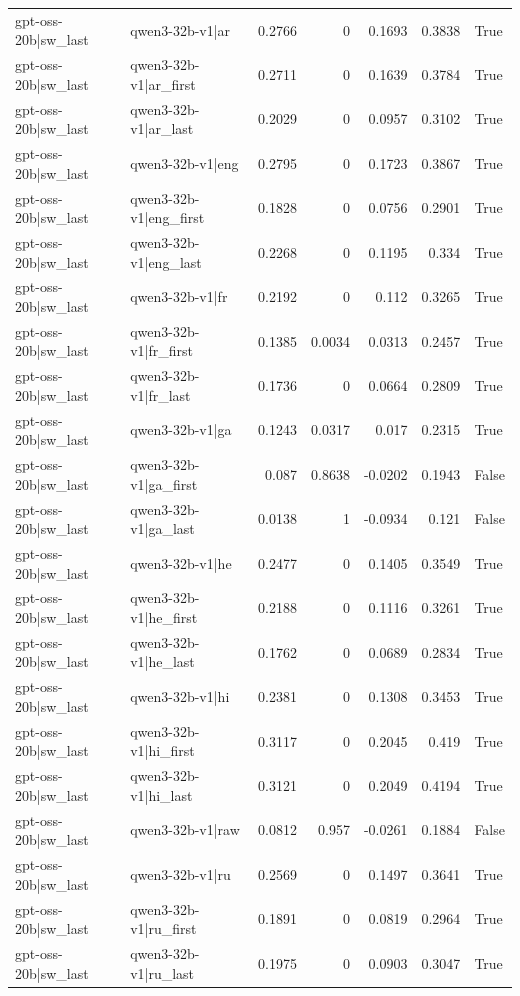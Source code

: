 \begin{table}
\begin{tabular}{l l r r r r l}
gpt-oss-20b|sw_last & qwen3-32b-v1|ar & 0.2766 & 0 & 0.1693 & 0.3838 & True \\
gpt-oss-20b|sw_last & qwen3-32b-v1|ar_first & 0.2711 & 0 & 0.1639 & 0.3784 & True \\
gpt-oss-20b|sw_last & qwen3-32b-v1|ar_last & 0.2029 & 0 & 0.0957 & 0.3102 & True \\
gpt-oss-20b|sw_last & qwen3-32b-v1|eng & 0.2795 & 0 & 0.1723 & 0.3867 & True \\
gpt-oss-20b|sw_last & qwen3-32b-v1|eng_first & 0.1828 & 0 & 0.0756 & 0.2901 & True \\
gpt-oss-20b|sw_last & qwen3-32b-v1|eng_last & 0.2268 & 0 & 0.1195 & 0.334 & True \\
gpt-oss-20b|sw_last & qwen3-32b-v1|fr & 0.2192 & 0 & 0.112 & 0.3265 & True \\
gpt-oss-20b|sw_last & qwen3-32b-v1|fr_first & 0.1385 & 0.0034 & 0.0313 & 0.2457 & True \\
gpt-oss-20b|sw_last & qwen3-32b-v1|fr_last & 0.1736 & 0 & 0.0664 & 0.2809 & True \\
gpt-oss-20b|sw_last & qwen3-32b-v1|ga & 0.1243 & 0.0317 & 0.017 & 0.2315 & True \\
gpt-oss-20b|sw_last & qwen3-32b-v1|ga_first & 0.087 & 0.8638 & -0.0202 & 0.1943 & False \\
gpt-oss-20b|sw_last & qwen3-32b-v1|ga_last & 0.0138 & 1 & -0.0934 & 0.121 & False \\
gpt-oss-20b|sw_last & qwen3-32b-v1|he & 0.2477 & 0 & 0.1405 & 0.3549 & True \\
gpt-oss-20b|sw_last & qwen3-32b-v1|he_first & 0.2188 & 0 & 0.1116 & 0.3261 & True \\
gpt-oss-20b|sw_last & qwen3-32b-v1|he_last & 0.1762 & 0 & 0.0689 & 0.2834 & True \\
gpt-oss-20b|sw_last & qwen3-32b-v1|hi & 0.2381 & 0 & 0.1308 & 0.3453 & True \\
gpt-oss-20b|sw_last & qwen3-32b-v1|hi_first & 0.3117 & 0 & 0.2045 & 0.419 & True \\
gpt-oss-20b|sw_last & qwen3-32b-v1|hi_last & 0.3121 & 0 & 0.2049 & 0.4194 & True \\
gpt-oss-20b|sw_last & qwen3-32b-v1|raw & 0.0812 & 0.957 & -0.0261 & 0.1884 & False \\
gpt-oss-20b|sw_last & qwen3-32b-v1|ru & 0.2569 & 0 & 0.1497 & 0.3641 & True \\
gpt-oss-20b|sw_last & qwen3-32b-v1|ru_first & 0.1891 & 0 & 0.0819 & 0.2964 & True \\
gpt-oss-20b|sw_last & qwen3-32b-v1|ru_last & 0.1975 & 0 & 0.0903 & 0.3047 & True \\

\end{tabular}
\end{table}
